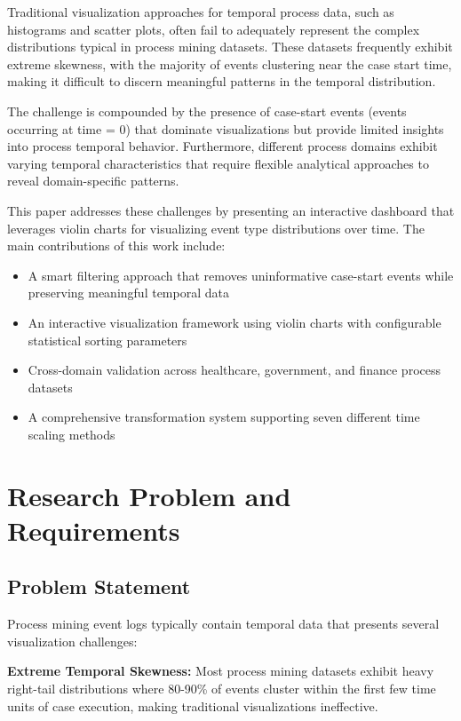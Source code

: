 \documentclass[11pt,a4paper]{article}
\begin{document}
Traditional visualization approaches for temporal process data, such as histograms and scatter plots, often fail to adequately represent the complex distributions typical in process mining datasets. These datasets frequently exhibit extreme skewness, with the majority of events clustering near the case start time, making it difficult to discern meaningful patterns in the temporal distribution.

The challenge is compounded by the presence of case-start events (events occurring at time = 0) that dominate visualizations but provide limited insights into process temporal behavior. Furthermore, different process domains exhibit varying temporal characteristics that require flexible analytical approaches to reveal domain-specific patterns.

This paper addresses these challenges by presenting an interactive dashboard that leverages violin charts for visualizing event type distributions over time. The main contributions of this work include:

\begin{itemize}
    \item A smart filtering approach that removes uninformative case-start events while preserving meaningful temporal data
    \item An interactive visualization framework using violin charts with configurable statistical sorting parameters
    \item Cross-domain validation across healthcare, government, and finance process datasets
    \item A comprehensive transformation system supporting seven different time scaling methods
\end{itemize}
\section{Research Problem and Requirements}
\label{sec:problem}

\subsection{Problem Statement}

Process mining event logs typically contain temporal data that presents several visualization challenges:

\textbf{Extreme Temporal Skewness:} Most process mining datasets exhibit heavy right-tail distributions where 80-90\% of events cluster within the first few time units of case execution, making traditional visualizations ineffective.
\end{document}
